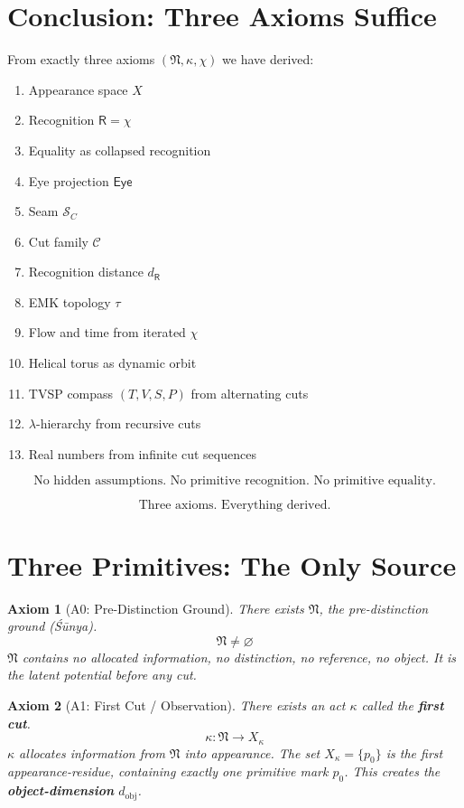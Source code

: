 \documentclass[12pt]{article}
\newtheorem{axiom}{Axiom}
\newcommand{\Shunya}{\mathfrak{N}}
\newcommand{\cut}{\kappa}
\newcommand{\selfcut}{\chi}
\newcommand{\seam}{\mathcal{S}}
\newcommand{\eye}{\mathsf{Eye}}
\newcommand{\rec}{\mathsf{R}}
\newcommand{\dist}{d_{\rec}}
\begin{document}
\section{Conclusion: Three Axioms Suffice}

From exactly three axioms $(\Shunya, \cut, \selfcut)$ we have derived:

\begin{enumerate}
    \item Appearance space $X$
    \item Recognition $\rec = \selfcut$
    \item Equality as collapsed recognition
    \item Eye projection $\eye$
    \item Seam $\seam_C$
    \item Cut family $\mathcal{C}$
    \item Recognition distance $\dist$
    \item EMK topology $\tau$
    \item Flow and time from iterated $\selfcut$
    \item Helical torus as dynamic orbit
    \item TVSP compass $(T,V,S,P)$ from alternating cuts
    \item $\lambda$-hierarchy from recursive cuts
    \item Real numbers from infinite cut sequences
\end{enumerate}

\[
\boxed{
\text{No hidden assumptions. No primitive recognition. No primitive equality.}
}
\]

\[
\boxed{
\text{Three axioms. Everything derived.}
}
\]
\section{Three Primitives: The Only Source}

\begin{axiom}[A0: Pre-Distinction Ground]
There exists \(\mathfrak N\), the pre-distinction ground (Śūnya).
\[
\mathfrak N \neq \varnothing
\]
\(\mathfrak N\) contains no allocated information, no distinction, no reference, no object.
It is the latent potential before any cut.
\end{axiom}

\begin{axiom}[A1: First Cut / Observation]
There exists an act \(\kappa\) called the \textbf{first cut}.
\[
\kappa: \mathfrak N \longrightarrow X_\kappa
\]
\(\kappa\) allocates information from \(\mathfrak N\) into appearance.
The set \(X_\kappa = \{p_0\}\) is the first appearance-residue,
containing exactly one primitive mark \(p_0\).
This creates the \textbf{object-dimension} \(d_{\text{obj}}\).
\end{axiom}
\end{document}
